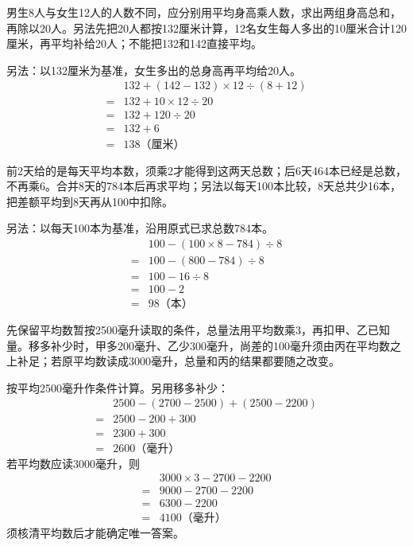 \documentclass[multi=snippet,border=0pt]{standalone}
\newenvironment{snippet}[3]{\begin{minipage}{#1bp}\color{answerred}\fontsize{#2}{#3}\selectfont\raggedright}{\end{minipage}}
\begin{document}
\begin{snippet}{505}{11.5}{14}男生8人与女生12人的人数不同，应分别用平均身高乘人数，求出两组身高总和，再除以20人。另法先把20人都按132厘米计算，12名女生每人多出的10厘米合计120厘米，再平均补给20人；不能把132和142直接平均。\par 另法：以132厘米为基准，女生多出的总身高再平均给20人。\[\begin{aligned} &132+(142-132)\times12\div(8+12)\\={}&132+10\times12\div20\\={}&132+120\div20\\={}&132+6\\={}&138\text{（厘米）}\end{aligned}\]\end{snippet}
\begin{snippet}{505}{11.5}{14}前2天给的是每天平均本数，须乘2才能得到这两天总数；后6天464本已经是总数，不再乘6。合并8天的784本后再求平均；另法以每天100本比较，8天总共少16本，把差额平均到8天再从100中扣除。\par 另法：以每天100本为基准，沿用原式已求总数784本。\[\begin{aligned}&100-(100\times8-784)\div8\\={}&100-(800-784)\div8\\={}&100-16\div8\\={}&100-2\\={}&98\text{（本）}\end{aligned}\]\end{snippet}
\begin{snippet}{505}{11.5}{14}先保留平均数暂按2500毫升读取的条件，总量法用平均数乘3，再扣甲、乙已知量。移多补少时，甲多200毫升、乙少300毫升，尚差的100毫升须由丙在平均数之上补足；若原平均数读成3000毫升，总量和丙的结果都要随之改变。\par 按平均2500毫升作条件计算。另用移多补少：\[\begin{aligned}&2500-(2700-2500)+(2500-2200)\\={}&2500-200+300\\={}&2300+300\\={}&2600\text{（毫升）}\end{aligned}\]若平均数应读3000毫升，则\[\begin{aligned}&3000\times3-2700-2200\\={}&9000-2700-2200\\={}&6300-2200\\={}&4100\text{（毫升）}\end{aligned}\]须核清平均数后才能确定唯一答案。\end{snippet}
\end{document}
